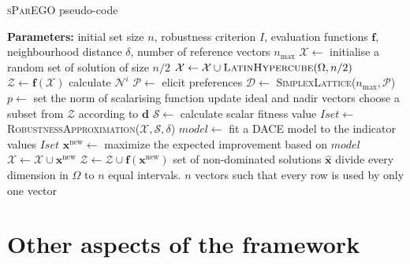\documentclass[a4paper]{article}
\newcommand{\brr}[1]{{\left({#1}\right)}} %
\newcommand{\vx}{\ensuremath{\mathbf{x}}} %
\newcommand{\vf}{\ensuremath{\mathbf{f}}} %
\newcommand{\vd}{\ensuremath{\mathbf{d}}} %
\newcommand{\DSet}{\ensuremath{\mathcal{D}}} %
\newcommand{\NSet}{\ensuremath{\mathcal{N}}} %
\newcommand{\XSet}{\ensuremath{\mathcal{X}}} %
\newcommand{\ZSet}{\ensuremath{\mathcal{Z}}} %
\newcommand{\SSet}{\ensuremath{\mathcal{S}}} %
\newcommand{\Pref}{\ensuremath{\mathcal{P}}} %
\begin{document}
\begin{algorithm}
\caption{\textsc{sParEGO} pseudo-code}
\label{alg:sParEGO}
\begin{algorithmic}[1]
	\Statex \textbf{Parameters:} initial set size $n$, robustness criterion $I$,
	\Statex \hspace{22mm} evaluation functions $\vf$, neighbourhood distance $\delta$,
	\Statex \hspace{22mm} number of reference vectors $n_\text{max}$
	\State $\XSet \leftarrow$ initialise a random set of solution of size $n/2$
	\label{line:randInit}
	\State $\XSet \leftarrow \XSet \cup \textsc{LatinHypercube}\brr{\Omega,n/2}$ 
	\label{line:LHS}
	\State $\ZSet \leftarrow \vf\brr{\XSet}$ 
	\ForAll{$\vx^i\in\XSet$}
		\State calculate $\NSet^i$ 
	\EndFor
		\State $\Pref \leftarrow$ elicit preferences
		\State $\DSet \leftarrow$ \textsc{SimplexLattice}($n_\text{max},\Pref$) 
		\State $p \leftarrow$ set the norm of scalarising function
		\ForAll{$\vd\in\DSet$}
			\State update ideal and nadir vectors
			\State choose a subset from $\ZSet$ according to \vd
			\label{line:subset}
			\State $\SSet \leftarrow$ calculate scalar fitness value 
			\State $Iset \leftarrow$ \textsc{RobustnessApproximation($\XSet,\SSet,\delta$)} 
			\State $model \leftarrow$ fit a DACE model to the indicator values $Iset$
			\State $\vx^\text{new} \leftarrow$ maximize the expected improvement based on $model$ \label{line:optimize model}
			\State $\XSet \leftarrow \XSet \cup \vx^\text{new}$
			\State $\ZSet \leftarrow \ZSet \cup \vf\brr{\vx^\text{new}}$ 
		\EndFor
	\EndWhile
	\State \Return set of non-dominated solutions $\hat{\vx}$
\Statex
{} \label{state:latin}
	\State divide every dimension in $\Omega$ to $n$ equal intervals.
	\State \Return $n$ vectors such that every row is used by only one vector
\EndProcedure
\end{algorithmic}
\end{algorithm}

\section{Other aspects of the framework}
\label{sec:Other aspects}
\end{document}
